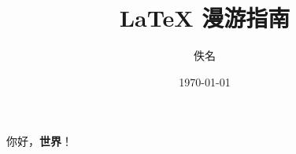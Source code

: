\documentclass[a4paper,zihao=-4,fontset=founderfree]{ctexart}
\title{\LaTeX{} 漫游指南}
\author{佚名}
\date{\today}
\begin{document}
    \maketitle

    你好，\textbf{世界}！
\end{document}
